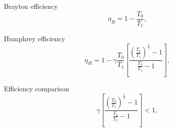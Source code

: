 \documentclass[12pt]{article}
\begin{document}
	Brayton efficiency
     \begin{equation}
         \eta_{B} = 1 - \frac{T_{0}}{T_{1}},
     \end{equation}

     Humphrey efficiency
     \begin{equation}
         \eta_{H} = 1 - \gamma \frac{T_{0}}{T_{1}} \left[ \frac{\left( \frac{T_{2}}{T_{1}} \right)^{\frac{1}{\gamma}} - 1}{ \frac{T_{2}}{T_{1}} - 1} \right],
     \end{equation}

	Efficiency comparison
     \begin{equation}
         \gamma \left[ \frac{\left( \frac{T_{2}}{T_{1}} \right)^{\frac{1}{\gamma}} - 1}{ \frac{T_{2}}{T_{1}} - 1} \right] < 1,
     \end{equation}
\end{document}
